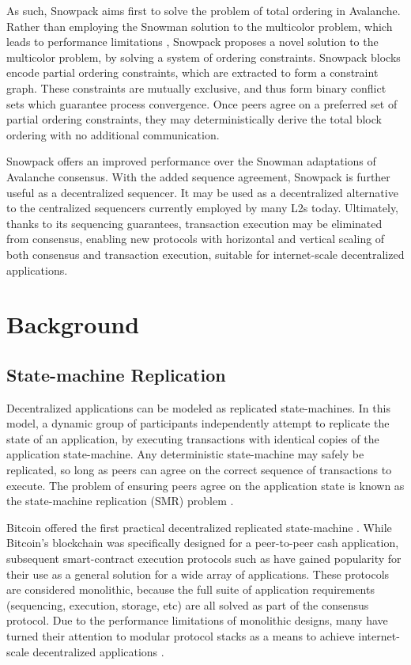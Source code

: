 \documentclass[12pt]{article}
\begin{document}
  As such, Snowpack aims first to solve the problem of total ordering in
  Avalanche. Rather than employing the Snowman solution to the multicolor
  problem, which leads to performance limitations \cite{buchwald2024frosty},
  Snowpack proposes a novel solution to the multicolor problem, by solving a
  system of ordering constraints. Snowpack blocks encode partial ordering
  constraints, which are extracted to form a constraint graph. These
  constraints are mutually exclusive, and thus form binary conflict sets which
  guarantee process convergence. Once peers agree on a preferred set of partial
  ordering constraints, they may deterministically derive the total block
  ordering with no additional communication.

  Snowpack offers an improved performance over the Snowman adaptations of
  Avalanche consensus. With the added sequence agreement, Snowpack is further
  useful as a decentralized sequencer. It may be used as a decentralized
  alternative to the centralized sequencers currently employed by many L2s
  today. Ultimately, thanks to its sequencing guarantees, transaction execution
  may be eliminated from consensus, enabling new protocols with horizontal and
  vertical scaling of both consensus and transaction execution, suitable for
  internet-scale decentralized applications.

\section{Background}
\subsection{State-machine Replication}
  \label{sec:State-machine Replication}
  Decentralized applications can be modeled as replicated state-machines. In
  this model, a dynamic group of participants independently attempt to
  replicate the state of an application, by executing transactions with
  identical copies of the application state-machine. Any deterministic
  state-machine may safely be replicated, so long as peers can agree on the
  correct sequence of transactions to execute. The problem of ensuring peers
  agree on the application state is known as the state-machine replication
  (SMR) problem \cite{schneider1990}.

  Bitcoin offered the first practical decentralized replicated state-machine
  \cite{naka}. While Bitcoin's blockchain was specifically designed for a
  peer-to-peer cash application, subsequent smart-contract execution protocols
  such as \cite{buterin2014ethereum, SolanaWhitepaper} have gained popularity
  for their use as a general solution for a wide array of applications. These
  protocols are considered monolithic, because the full suite of application
  requirements (sequencing, execution, storage, etc) are all solved as part of
  the consensus protocol. Due to the performance limitations of monolithic
  designs, many have turned their attention to modular protocol stacks as a
  means to achieve internet-scale decentralized applications \cite{LazyLedger,
  avail}.
\end{document}
